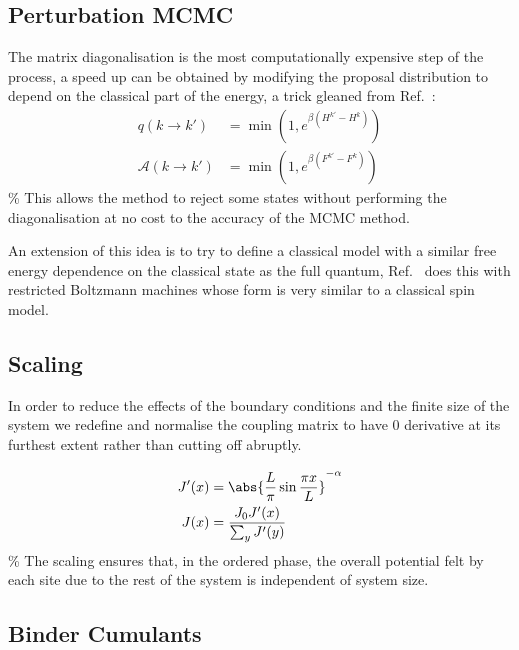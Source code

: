 \hypertarget{perturbation-mcmc}{%
\subsection{Perturbation MCMC}\label{perturbation-mcmc}}

The matrix diagonalisation is the most computationally expensive step of the process, a speed up can be obtained by modifying the proposal distribution to depend on the classical part of the energy, a trick gleaned from Ref.~\autocite{krauthIntroductionMonteCarlo1998}: \[
\begin{aligned}
q(k \to k') &= \min\left(1, e^{\beta (H^{k'} - H^k)}\right) \\
\mathcal{A}(k \to k') &= \min\left(1, e^{\beta(F^{k'}- F^k)}\right)
\end{aligned}\] \% This allows the method to reject some states without performing the diagonalisation at no cost to the accuracy of the MCMC method.

An extension of this idea is to try to define a classical model with a similar free energy dependence on the classical state as the full quantum, Ref.~\autocite{huangAcceleratedMonteCarlo2017} does this with restricted Boltzmann machines whose form is very similar to a classical spin model.

\hypertarget{scaling}{%
\subsection{Scaling}\label{scaling}}

In order to reduce the effects of the boundary conditions and the finite size of the system we redefine and normalise the coupling matrix to have 0 derivative at its furthest extent rather than cutting off abruptly.

\[
\begin{aligned}
J'(x) &= \abs{\frac{L}{\pi}\sin \frac{\pi x}{L}}^{-\alpha} \\
J(x) &= \frac{J_0 J'(x)}{\sum_y J'(y)}
\end{aligned}\] \% The scaling ensures that, in the ordered phase, the overall potential felt by each site due to the rest of the system is independent of system size.

\hypertarget{binder-cumulants}{%
\subsection{Binder Cumulants}\label{binder-cumulants}}

